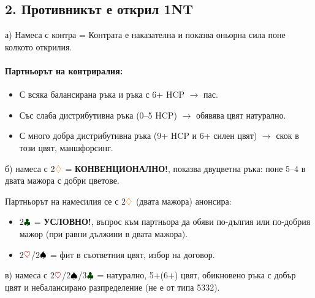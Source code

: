 \documentclass[10pt,a5paper]{extarticle}
\newcommand{\Rheart}{\textcolor{red}{\heartsuit}}
\newcommand{\Rdiamond}{\textcolor{orange}{\diamondsuit}}
\newcommand{\Bspade}{\textcolor{black}{\spadesuit}}
\newcommand{\Bclub}{\textcolor{darkgreen}{\clubsuit}}
\begin{document}

\subsection*{2. Противникът е открил 1NT}

а) Намеса с контра =
Контрата е наказателна и показва оньорна сила поне колкото открилия.

\paragraph{Партньорът на контриралия:}
\begin{itemize}
    \item С всяка балансирана ръка и ръка с 6+ HCP $\rightarrow$ пас.  
    \item Със слаба дистрибутивна ръка (0--5 HCP) $\rightarrow$ обявява цвят натурално.  
    \item С много добра дистрибутивна ръка (9+ HCP и 6+ силен цвят) $\rightarrow$ скок в този цвят, маншфорсинг.  
\end{itemize}


б) намеса с 2$\Rdiamond$ = \textbf{КОНВЕНЦИОНАЛНО!}, показва двуцветна ръка:   
поне 5--4 в двата мажора с добри цветове.  

Партньорът на намесилия се с 2$\Rdiamond$ (двата мажора) анонсира:  
\begin{itemize}
    \item 2$\Bclub$ = \textbf{УСЛОВНО!}, въпрос към партньора да обяви по-дългия или по-добрия мажор (при равни дължини в двата мажора).  
    \item 2$\Rheart$/2$\Bspade$ = фит в съответния цвят, избор на договор.  
\end{itemize}

в) намеса с 2$\Rheart$/2$\Bspade$/3$\Bclub$ = натурално, 5+(6+) цвят, обикновено ръка с добър цвят и небалансирано разпределение (не е от типа 5332).  
\end{document}
